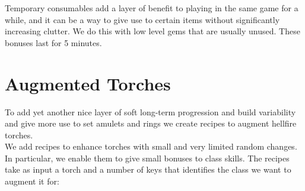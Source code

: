 \documentclass[12pt,a4paper]{article}
\begin{document}
Temporary consumables add a layer of benefit to playing in the same game for a while, and it can be a way to give use to certain items without significantly increasing clutter. We do this with low level gems that are usually unused. These bonuses last for 5 minutes.

\begin{center}
\end{center}

\section{Augmented Torches}

To add yet another nice layer of soft long-term progression and build variability and give more use to set amulets and rings we create recipes to augment hellfire torches.\\

We add recipes to enhance torches with small and very limited random changes. In particular, we enable them to give small bonuses to class skills. The recipes take as input a torch and a number of keys that identifies the class we want to augment it for:

\begin{center}
\end{center}
\end{document}
